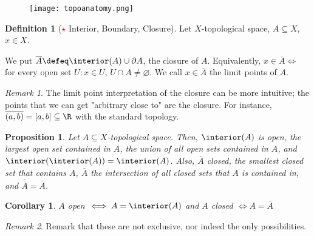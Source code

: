 \documentclass[12pt, oneside]{article}
\newcommand*{\important}{\textcolor{red}{$\star$} }
\theoremstyle{definition}
\newtheorem{defn}{Definition}
\theoremstyle{plain}
\newtheorem{cor}{Corollary}
\newtheorem{prop}{Proposition}
\theoremstyle{remark}
\newtheorem{remark}{Remark}
\begin{document}
\begin{figure*}[!ht]
  \centering
  \texttt{[image: topoanatomy.png]}
\end{figure*}

\begin{defn}[\important Interior, Boundary, Closure]
  Let $X$-topological space, $A \subseteq X$, $x \in X$. 
  We put $\overline{A} \defeq \interior(A) \cup \partial A$, the closure of $A$. Equivalently, $x \in \overline{A} \iff$ for every open set $U : x \in U$, $U \cap A \neq \varnothing$. We call $x \in \overline{A}$ the limit points of $A$.
\end{defn}

\begin{remark}
  The limit point interpretation of the closure can be more intuitive; the points that we can get "arbitrary close to" are the closure. For instance, $\overline{(a, b)} = [a, b] \subseteq \R$ with the standard topology. 
\end{remark}

\begin{prop}
  Let $A \subseteq X$-topological space. Then, $\interior(A)$ is open, the largest open set contained in $A$, the union of all open sets contained in $A$, and $\interior(\interior(A)) = \interior(A)$. Also, $\overline{A}$ closed, the smallest closed set that contains $A$, $\overline{A}$ the intersection of all closed sets that $A$ is contained in, and $\overline{\overline{A}} = \overline{A}$.
\end{prop}

\begin{cor}
  $A$ open $\iff A = \interior(A)$ and $A$ closed $\iff A = \overline{A}$
\end{cor}

\begin{remark}
  Remark that these are not exclusive, nor indeed the only possibilities.
\end{remark}
\end{document}
